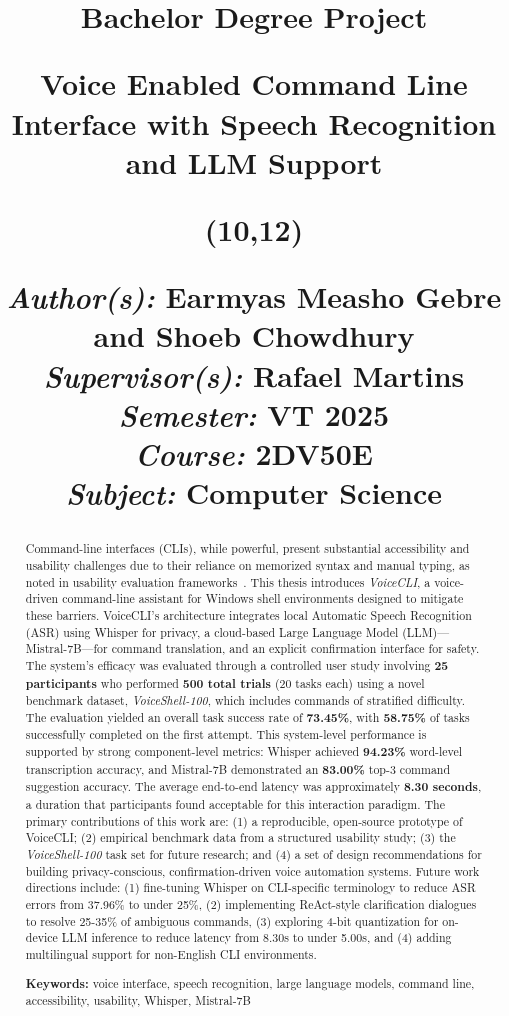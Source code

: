 \documentclass[a4paper,12pt]{article}
\title{
\vspace{-8cm}
\begin{sidebar}
    \vspace{10cm}
    \normalfont \normalsize
    \Huge Bachelor Degree Project \\
    \vspace{-1.3cm}
\end{sidebar}
\vspace{3cm}
\begin{flushleft}
    \huge Voice Enabled Command Line Interface with Speech Recognition and LLM Support\\ 
\end{flushleft}
\null
\vfill
\begin{textblock}{6}(10,12)
\begin{flushright}
\begin{minipage}{\textwidth}
\begin{flushleft} \large
\emph{Author(s):} Earmyas Measho Gebre and Shoeb Chowdhury\\
\emph{Supervisor(s):} Rafael Martins\\ 
\emph{Semester:} VT 2025\\
\emph{Course:} 2DV50E \\
\emph{Subject:} Computer Science \\
\end{flushleft}
\end{minipage}
\end{flushright}
\end{textblock}
}
\date{}
\newcommand\BackgroundPic{
    \put(-2,-3){
    \texttt{[image: img/lnu\_etch.png]}
    }
}
\newcommand\BackgroundPicLogo{
    \put(30,740){
    \texttt{[image: img/logo.png]}
    }
}
\begin{document}
\AddToShipoutPicture*{\BackgroundPic}
\AddToShipoutPicture*{\BackgroundPicLogo}
\maketitle
\restoregeometry
\clearpage
{}




\begin{abstract}
\noindent Command-line interfaces (CLIs), while powerful, present substantial accessibility and usability challenges due to their reliance on memorized syntax and manual typing, as noted in usability evaluation frameworks~\cite{ref16}. This thesis introduces \textit{VoiceCLI}, a voice-driven command-line assistant for Windows shell environments designed to mitigate these barriers. VoiceCLI's architecture integrates local Automatic Speech Recognition (ASR) using Whisper for privacy, a cloud-based Large Language Model (LLM)—Mistral-7B—for command translation, and an explicit confirmation interface for safety. The system's efficacy was evaluated through a controlled user study involving \textbf{25 participants} who performed \textbf{500 total trials} (20 tasks each) using a novel benchmark dataset, \textit{VoiceShell-100}, which includes commands of stratified difficulty. The evaluation yielded an overall task success rate of \textbf{73.45\%}, with \textbf{58.75\%} of tasks successfully completed on the first attempt. This system-level performance is supported by strong component-level metrics: Whisper achieved \textbf{94.23\%} word-level transcription accuracy, and Mistral-7B demonstrated an \textbf{83.00\%} top-3 command suggestion accuracy. The average end-to-end latency was approximately \textbf{8.30 seconds}, a duration that participants found acceptable for this interaction paradigm. The primary contributions of this work are: (1) a reproducible, open-source prototype of VoiceCLI; (2) empirical benchmark data from a structured usability study; (3) the \textit{VoiceShell-100} task set for future research; and (4) a set of design recommendations for building privacy-conscious, confirmation-driven voice automation systems. Future work directions include: (1) fine-tuning Whisper on CLI-specific terminology to reduce ASR errors from 37.96\% to under 25\%, (2) implementing ReAct-style clarification dialogues to resolve 25-35\% of ambiguous commands, (3) exploring 4-bit quantization for on-device LLM inference to reduce latency from 8.30s to under 5.00s, and (4) adding multilingual support for non-English CLI environments.

\vspace{1em}

\noindent\textbf{Keywords:} voice interface, speech recognition, large language models, command line, accessibility, usability, Whisper, Mistral-7B
\end{abstract}
\end{document}

